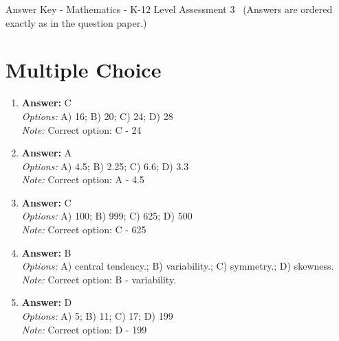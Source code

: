\documentclass[12pt]{article}
\begin{document}
\begin{center}
Answer Key - Mathematics - K-12 Level Assessment 3 \
\small (Answers are ordered exactly as in the question paper.)
\end{center}

\section*{Multiple Choice}
\begin{enumerate}[label=\arabic*.]
\item \textbf{Answer:} C
\\ \textit{Options:} A) 16; B) 20; C) 24; D) 28
\\ \textit{Note:} Correct option: C - 24
\item \textbf{Answer:} A
\\ \textit{Options:} A) 4.5; B) 2.25; C) 6.6; D) 3.3
\\ \textit{Note:} Correct option: A - 4.5
\item \textbf{Answer:} C
\\ \textit{Options:} A) 100; B) 999; C) 625; D) 500
\\ \textit{Note:} Correct option: C - 625
\item \textbf{Answer:} B
\\ \textit{Options:} A) central tendency.; B) variability.; C) symmetry.; D) skewness.
\\ \textit{Note:} Correct option: B - variability.
\item \textbf{Answer:} D
\\ \textit{Options:} A) 5; B) 11; C) 17; D) 199
\\ \textit{Note:} Correct option: D - 199
\end{enumerate}
\end{document}
